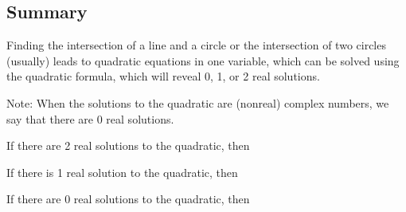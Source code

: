 \documentclass[nooutcomes]{ximera}
\begin{document}
%
%
%


\subsection{Summary}
Finding the intersection of a line and a circle or the intersection of two circles (usually) leads to quadratic equations in one variable, which can be solved using the quadratic formula, which will reveal 0, 1, or 2 real solutions.  

Note: When the solutions to the quadratic are (nonreal) complex numbers, we say that there are 0 real solutions.  

\begin{question}
If there are 2 real solutions to the quadratic, then
\begin{multipleChoice}
\end{multipleChoice}
\end{question}

\begin{question}
If there is 1 real solution to the quadratic, then
\begin{multipleChoice}
\end{multipleChoice}
\end{question}

\begin{question}
If there are 0 real solutions to the quadratic, then
\begin{multipleChoice}
\end{multipleChoice}
\end{question}
\end{document}
